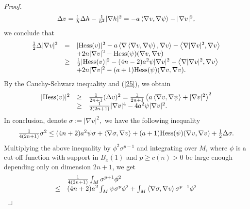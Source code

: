 \documentclass[12pt]{amsart}%
\numberwithin{equation}{section}
\begin{document}
\begin{proof}
\begin{equation}%
\begin{array}
[c]{c}%
\Delta v=\frac{1}{h}\Delta h-\frac{1}{h^{2}}|\nabla h|^{2}=-a\left\langle
\nabla v,\nabla\psi\right\rangle -|\nabla v|^{2},
\end{array}
\label{25}%
\end{equation}
we conclude that%
\[%
\begin{array}
[c]{lll}%
\frac{1}{2}\Delta|\nabla v|^{2} & = & |\mathrm{Hess}(v)|^{2}-a\left\langle
\nabla\left\langle \nabla v,\nabla\psi\right\rangle ,\nabla v\right\rangle
-\left\langle \nabla|\nabla v|^{2},\nabla v\right\rangle \\
&  & +2n|\nabla v|^{2}-\mathrm{Hess}(\psi)(\nabla v,\nabla v)\\
& \geq & \frac{1}{2}|\mathrm{Hess}(v)|^{2}-(4n-2)a^{2}\psi|\nabla
v|^{2}-\left\langle \nabla|\nabla v|^{2},\nabla v\right\rangle \\
&  & +2n|\nabla v|^{2}-(a+1)\mathrm{Hess}(\psi)(\nabla v,\nabla v).
\end{array}
\]
By the Cauchy-Schwarz inequality and (\ref{25}), we obtain%
\[%
\begin{array}
[c]{lll}%
|\mathrm{Hess}(v)|^{2} & \geq & \frac{1}{2n+1}(\Delta v)^{2}=\frac{1}%
{2n+1}\left(  a\left\langle \nabla v,\nabla\psi\right\rangle +|\nabla
v|^{2}\right)  ^{2}\\
& \geq & \frac{1}{2(2n+1)}|\nabla v|^{4}-4a^{2}\psi|\nabla v|^{2}.
\end{array}
\]
In conclusion, denote $\sigma:=|\nabla v|^{2},$ we have the following
inequality%
\begin{equation}%
\begin{array}
[c]{c}%
\frac{1}{4(2n+1)}\sigma^{2}\leq(4n+2)a^{2}\psi\sigma+\left\langle \nabla
\sigma,\nabla v\right\rangle +(a+1)\mathrm{Hess}(\psi)(\nabla v,\nabla
v)+\frac{1}{2}\Delta\sigma.
\end{array}
\label{26}%
\end{equation}
Multiplying the above inequality by $\phi^{2}\sigma^{p-1}$ and integrating
over $M$, where $\phi$ is a cut-off function with support in $B_{x}(1)$ and
$p\geq c(n)>0$ be large enough depending only on dimension $2n+1$, we get%
\begin{equation}%
\begin{array}
[c]{ll}
& \frac{1}{4(2n+1)}\int_{M}\sigma^{p+1}\phi^{2}\\
\leq & (4n+2)a^{2}\int_{M}\psi\sigma^{p}\phi^{2}+\int_{M}\left\langle
\nabla\sigma,\nabla v\right\rangle \sigma^{p-1}\phi^{2}\\

\end{array}
\end{equation}
\end{proof}
\end{document}
